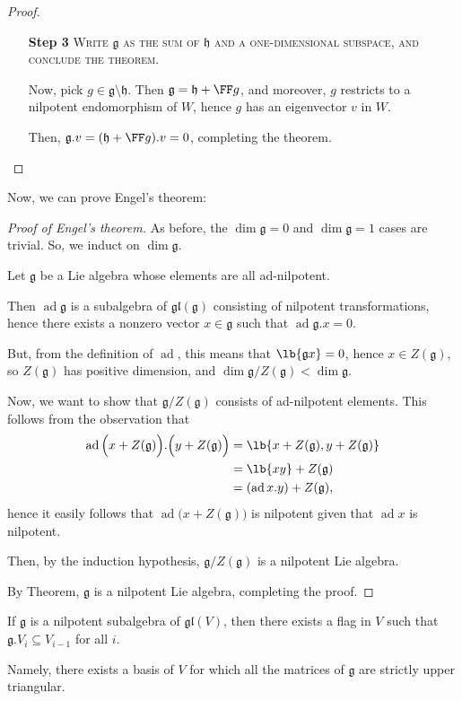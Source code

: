 \documentclass{article}
\DeclarePairedDelimiter\lb\lbrack\rbrack
\newcommand*\ad{\operatorname{ad}}
\newcommand*\frkg{{\ensuremath{\mathfrak{g}}}}
\newcommand*\frkh{{\ensuremath{\mathfrak{h}}}}
\newcommand*\gl{\ensuremath{\mathfrak{gl}}}
\newcommand*\acts{.}
\begin{document}
\begin{proof}
\begin{itemize}
        \item[\textbf{Step 3}] 
            \textsc{\color{Crimson} Write $\frkg$ as the sum of $\frkh$ and a one-dimensional subspace, and conclude the theorem.}

            Now, pick $g \in \frkg \setminus \frkh$.
            Then $\frkg = \frkh + \FF g$, and moreover, $g$ restricts to a nilpotent endomorphism of $W$, hence $g$ has an eigenvector $v$ in $W$.

            Then, $\frkg.v = (\frkh + \FF g) \acts v = 0$, completing the theorem.
        \end{itemize}
\end{proof}

Now, we can prove Engel's theorem:

\begin{proof}[Proof of Engel's theorem]
    As before, the $\dim \frkg = 0$ and $\dim \frkg = 1$ cases are trivial.
    So, we induct on $\dim \frkg$.

    Let $\frkg$ be a Lie algebra whose elements are all ad-nilpotent.

    Then $\ad \frkg$ is a subalgebra of $\gl(\frkg)$ consisting of nilpotent transformations, hence there exists a nonzero vector $x \in \frkg$ such that $\ad \frkg \acts x = 0$.

    But, from the definition of $\ad$, this means that $\lb{\frkg x} = 0$, hence $x \in Z(\frkg)$, so $Z(\frkg)$ has positive dimension, and $\dim \frkg / Z(\frkg) < \dim \frkg$.

    Now, we want to show that $\frkg/Z(\frkg)$ consists of ad-nilpotent elements.
    This follows from the observation that
    \begin{align*}
        \ad \Big(x + Z(\frkg)\Big) \acts \Big(y + Z(\frkg)\Big)
        &= 
        \lb{x + Z(\frkg), y + Z(\frkg)} 
        \\
        &= \lb{xy} + Z(\frkg) 
        \\
        &= (\ad x \acts y) + Z(\frkg),
    \end{align*}
    hence it easily follows that $\ad \Big(x + Z(\frkg)\Big)$ is nilpotent given that $\ad x$ is nilpotent.
    
    Then, by the induction hypothesis, $\frkg/Z(\frkg)$ is a nilpotent Lie algebra.

    By Theorem, $\frkg$ is a nilpotent Lie algebra, completing the proof.
\end{proof}

\begin{corollary}
    If $\frkg$ is a nilpotent subalgebra of $\gl(V)$, then there exists a flag in $V$ such that $\frkg \acts V_i \subseteq V_{i-1}$ for all $i$.

    Namely, there exists a basis of $V$ for which all the matrices of $\frkg$ are strictly upper triangular.
\end{corollary}
\end{document}
